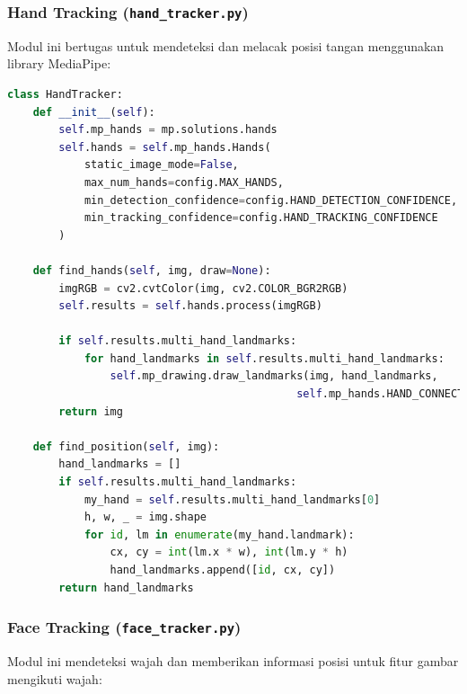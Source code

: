 \documentclass[11pt,a4paper]{article}
\begin{document}
\subsubsection{Hand Tracking (\texttt{hand\_tracker.py})}
Modul ini bertugas untuk mendeteksi dan melacak posisi tangan menggunakan library MediaPipe:

\begin{lstlisting}[language=Python, caption=Implementasi hand tracking]
class HandTracker:
    def __init__(self):
        self.mp_hands = mp.solutions.hands
        self.hands = self.mp_hands.Hands(
            static_image_mode=False,
            max_num_hands=config.MAX_HANDS,
            min_detection_confidence=config.HAND_DETECTION_CONFIDENCE,
            min_tracking_confidence=config.HAND_TRACKING_CONFIDENCE
        )
    
    def find_hands(self, img, draw=None):
        imgRGB = cv2.cvtColor(img, cv2.COLOR_BGR2RGB)
        self.results = self.hands.process(imgRGB)
        
        if self.results.multi_hand_landmarks:
            for hand_landmarks in self.results.multi_hand_landmarks:
                self.mp_drawing.draw_landmarks(img, hand_landmarks, 
                                             self.mp_hands.HAND_CONNECTIONS)
        return img
    
    def find_position(self, img):
        hand_landmarks = []
        if self.results.multi_hand_landmarks:
            my_hand = self.results.multi_hand_landmarks[0]
            h, w, _ = img.shape
            for id, lm in enumerate(my_hand.landmark):
                cx, cy = int(lm.x * w), int(lm.y * h)
                hand_landmarks.append([id, cx, cy])
        return hand_landmarks
\end{lstlisting}

\subsubsection{Face Tracking (\texttt{face\_tracker.py})}
Modul ini mendeteksi wajah dan memberikan informasi posisi untuk fitur gambar mengikuti wajah:
\end{document}
